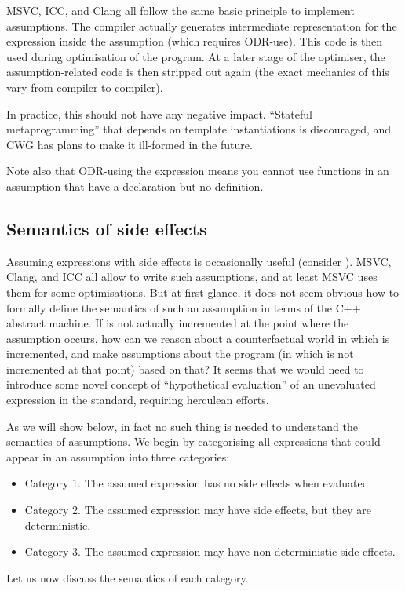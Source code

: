 MSVC, ICC, and Clang all follow the same basic principle to implement assumptions. The compiler actually generates intermediate representation for the expression inside the assumption (which requires ODR-use). This code is then used during optimisation of the program. At a later stage of the optimiser, the assumption-related code is then stripped out again (the exact mechanics of this vary from compiler to compiler).

In practice, this should not have any negative impact. ``Stateful metaprogramming'' that depends on template instantiations is discouraged, and CWG has plans to make it ill-formed in the future.

Note also that ODR-using the expression means you cannot use functions in an assumption that have a declaration but no definition.

\subsection{Semantics of side effects}
\label{subsec:side_effects}

Assuming expressions with side effects is occasionally useful (consider \tcode{[[assume(++ptr != end)]]}). MSVC, Clang, and ICC all allow to write such assumptions, and at least MSVC uses them for some optimisations. But at first glance, it does not seem obvious how to formally define the semantics of such an assumption in terms of the C++ abstract machine. If  is not actually incremented at the point where the assumption occurs, how can we reason about a counterfactual world in which  is incremented, and make assumptions about the program (in which  is not incremented at that point) based on that? It seems that we would need to introduce some novel concept of ``hypothetical evaluation'' of an unevaluated expression in the standard, requiring herculean efforts.

As we will show below, in fact no such thing is needed to understand the semantics of assumptions. We begin by categorising all expressions that could appear in an assumption into three categories:
\begin{itemize}
\item Category 1. The assumed expression has no side effects when evaluated.
\item Category 2. The assumed expression may have side effects, but they are deterministic.
\item Category 3. The assumed expression may have non-deterministic side effects.
\end{itemize}
Let us now discuss the semantics of each category.

